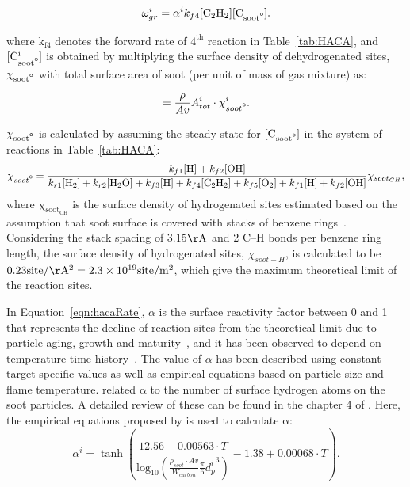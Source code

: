 \begin{equation}
	\omega^i_{gr} = \alpha^i k_{f4} [\mathrm{C_2H_2}][\mathrm{C_{soot\mbox{\textdegree}}}]
	\label{eqn:hacaRate}.
\end{equation}

\noindent where $\mathrm{k_{f4}}$ denotes the forward rate of $\mathrm{4^{th}}$ reaction in Table~\ref{tab:HACA}, and $\mathrm{[C^i_{soot\mbox{\textdegree}}]}$ is obtained by multiplying the surface density of dehydrogenated sites, $\mathrm{\chi_{soot\mbox{\textdegree}}}$ with total surface area of soot (per unit of mass of gas mixture) as:

\begin{equation}
	[\mathrm{C^i_{soot\mbox{\textdegree}}}] = \frac{\rho}{Av}A^i_{tot}\cdot\chi^i_{soot\mbox{\textdegree}}
	\label{eqn:csoot0}.
\end{equation}

$\mathrm{\chi_{soot\mbox{\textdegree}}}$ is calculated by assuming the steady-state for $\mathrm{[C_{soot\mbox{\textdegree}}]}$ in the system of reactions in Table~\ref{tab:HACA}:
\begin{equation}
	\chi_{soot\mbox{\textdegree}} = 
	\frac
	{k_{f1}[\mathrm{H}]+k_{f2}[\mathrm{OH}]}
	{k_{r1}[\mathrm{H_2}]+k_{r2}[\mathrm{H_2O}]+k_{f3}[\mathrm{H}]+k_{f4}[\mathrm{C_2H_2}]+k_{f5}[\mathrm{O_2}]+k_{f1}[\mathrm{H}]+k_{f2}[\mathrm{OH}]} \chi_{soot_{CH}}
	\label{eqn:chisoot0},
\end{equation}
\noindent where $\mathrm{\chi_{soot_{CH}}}$ is the surface density of hydrogenated sites estimated based on the assumption that soot surface is covered with stacks of benzene rings~\citep{appel2000kinetic}. Considering the stack spacing of 3.15$\mathrm{\AA}$ and 2 C–H bonds per benzene ring length, the surface density of hydrogenated sites, $\chi_{{soot}-H}$, is calculated to be $\mathrm{0.23}  \mathrm{site/\AA^2}=2.3\times10^{19} \mathrm{site/m^2}$, which give the maximum theoretical limit of the reaction sites.

In Equation~\eqref{eqn:hacaRate}, $\alpha$ is the surface reactivity factor between 0 and 1 that represents the decline of reaction sites from the theoretical limit due to particle aging, growth and maturity~\citep{haynes1982surface, harris1985chemical}, and it has been observed to depend on temperature time history~\cite{homann1985formation, dasch1985decay}. The value of $\alpha$ has been described using constant target-specific values as well as empirical equations based on particle size and flame temperature. \citet{blanquart2009joint} related $\mathrm{\alpha}$ to the number of surface hydrogen atoms on the soot particles. A detailed review of these can be found in the chapter 4 of \citep{veshkini2015understanding}.  Here, the empirical equations proposed by \citet{appel2000kinetic} is used to calculate $\mathrm{\alpha}$:
\begin{equation}
	\alpha^i = \tanh 
	\left(
	\frac{12.56 - 0.00563\cdot T}
	{\mbox{log}_{10}
		\left( \frac{\rho_{soot}\cdot Av}{W_{carbon}} \frac{\pi}{6}{d^i_p}^3 \right) } -1.38+0.00068\cdot T
	\right)
	\label{eqn:alpha}.
\end{equation}


